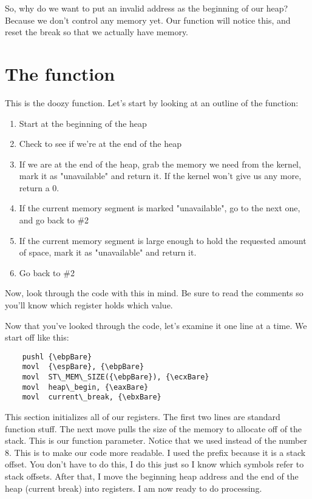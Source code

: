 So, why do we want to put an invalid address as the beginning of our heap?  Because we don't control
any memory yet.  Our  function will notice this, and reset the break
so that we actually have memory.

\section{The  function}

This is the doozy function.  Let's start by looking at an outline of the function:

\begin{enumerate}
\item Start at the beginning of the heap 
\item Check to see if we're at the end of the heap 
\item If we are at the end of the heap, grab the memory we need from the kernel, mark it
as "unavailable" and return it.  If the kernel won't give us any more, return a 0. 
\item If the current memory segment is marked "unavailable", go to the next one, and go
back to \#2 
\item If the current memory segment is large enough to hold the requested amount of space,
mark it as "unavailable" and return it. 
\item Go back to \#2 
\end{enumerate}

Now, look through the code with this in mind.  Be sure to read the comments so you'll know 
which register holds which value.  

Now that you've looked through the code, let's examine it one line at a time.  We start
off like this:

\begin{simpletyping}
\begin{lstlisting}
	pushl {\ebpBare}
	movl  {\espBare}, {\ebpBare}
	movl  ST\_MEM\_SIZE({\ebpBare}), {\ecxBare}
	movl  heap\_begin, {\eaxBare}
	movl  current\_break, {\ebxBare}
\end{lstlisting}
\end{simpletyping}

This section initializes all of our registers.  The first two lines are standard function
stuff.  The next move pulls the size of the memory to allocate off of the stack.  This is
our function parameter.  Notice that we used  instead of the
number 8.  This is to make our code more readable.  I used the prefix 
because it is a stack offset.  You don't have to do this, I do this just so I know which
symbols refer to stack offsets.  After that, I move the beginning heap address and the 
end of the heap (current break) into registers.  I am now ready to do processing.

